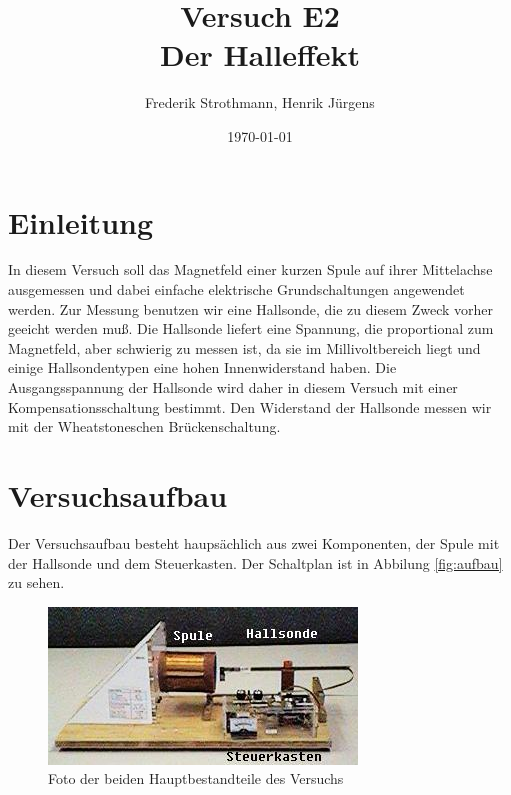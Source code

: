 \documentclass[12pt]{scrartcl}
\title{Versuch E2\\ Der Halleffekt}
\author{Frederik Strothmann, Henrik Jürgens}
\date{\today}
\begin{document}

\maketitle
\tableofcontents
\newpage


\section{Einleitung}

In diesem Versuch soll das Magnetfeld einer kurzen Spule auf ihrer Mittelachse ausgemessen und dabei einfache elektrische Grundschaltungen angewendet werden. Zur Messung benutzen wir eine Hallsonde, die zu diesem Zweck vorher geeicht werden muß. Die Hallsonde liefert eine Spannung, die proportional zum Magnetfeld, aber schwierig zu messen ist, da sie im Millivoltbereich liegt und einige Hallsondentypen eine hohen Innenwiderstand haben. Die Ausgangsspannung der Hallsonde wird daher in diesem Versuch mit einer Kompensationsschaltung bestimmt. Den Widerstand der Hallsonde messen wir mit der
Wheatstoneschen Brückenschaltung.


\section{Versuchsaufbau}
Der Versuchsaufbau besteht haupsächlich aus zwei Komponenten, der Spule mit der Hallsonde und dem Steuerkasten.
Der Schaltplan ist in Abbilung \ref{fig:aufbau} zu sehen.

\begin{figure}[htbp] 
  \centering
    \includegraphics[scale = 0.5]{kasten_und_spule.JPG}
  	\caption[Foto der beiden Hauptbestandteile des Versuchs]{Foto der beiden Hauptbestandteile des Versuchs\footnotemark}
  \label{fig:kasten_und_spule}
\end{figure}
\end{document}

